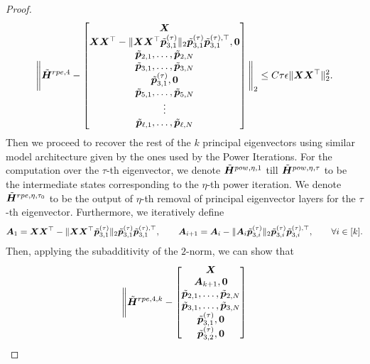 \begin{proof}
    \begin{align*}
        \Bigg\Vert\tilde{\boldsymbol{H}}^{rpe,4}-\begin{bmatrix}
            \boldsymbol{X}\\
            \boldsymbol{X}\boldsymbol{X}^\top-\Vert\boldsymbol{X}\boldsymbol{X}^\top\tilde{\boldsymbol{p}}_{3,1}^{(\tau)}\Vert_2\tilde{\boldsymbol{p}}_{3,1}^{(\tau)}\tilde{\boldsymbol{p}}_{3,1}^{(\tau),\top},\boldsymbol{0}\\
            \tilde{\boldsymbol{p}}_{2,1},\ldots,\tilde{\boldsymbol{p}}_{2,N}\\
            \tilde{\boldsymbol{p}}_{3,1},\ldots,\tilde{\boldsymbol{p}}_{3,N}\\
            \tilde{\boldsymbol{p}}_{3,1}^{(\tau)},\boldsymbol{0}\\
            \tilde{\boldsymbol{p}}_{5,1},\ldots,\tilde{\boldsymbol{p}}_{5,N}\\
            \vdots\\
            \tilde{\boldsymbol{p}}_{\ell,1},\ldots,\tilde{\boldsymbol{p}}_{\ell,N}
        \end{bmatrix}\Bigg\Vert_2\leq C\tau\epsilon\Vert\boldsymbol{X}\boldsymbol{X}^\top\Vert_2^2.
    \end{align*}
    Then we proceed to recover the rest of the $k$ principal eigenvectors using similar model architecture given by the ones used by the Power Iterations. For the computation over the $\tau$-th eigenvector, we denote $\tilde{\boldsymbol{H}}^{pow, \eta, 1}$ till $\tilde{\boldsymbol{H}}^{pow, \eta, \tau}$ to be the intermediate states corresponding to the $\eta$-th power iteration. We denote $\tilde{\boldsymbol{H}}^{rpe,\eta,\tau_0}$ to be the output of $\eta$-th removal of principal eigenvector layers for the $\tau$-th eigenvector. Furthermore, we iteratively define
    \begin{align*}
        \boldsymbol{A}_1 =\boldsymbol{X}\boldsymbol{X}^\top-\Vert\boldsymbol{X}\boldsymbol{X}^\top\tilde{\boldsymbol{p}}_{3,1}^{(\tau)}\Vert_2\tilde{\boldsymbol{p}}_{3,1}^{(\tau)}\tilde{\boldsymbol{p}}_{3,1}^{(\tau),\top},\qquad \boldsymbol{A}_{i+1}=\boldsymbol{A}_{i}-\Vert\boldsymbol{A}_i\tilde{\boldsymbol{p}}_{3,i}^{(\tau)}\Vert_2\tilde{\boldsymbol{p}}_{3,i}^{(\tau)}\tilde{\boldsymbol{p}}_{3,i}^{(\tau),\top},\qquad\forall i\in[k].
    \end{align*}
    Then, applying the subadditivity of the $2$-norm, we can show that
    \begin{align*}
        \Bigg\Vert\tilde{\boldsymbol{H}}^{rpe,4,k}-\begin{bmatrix}
            \boldsymbol{X}\\
            \boldsymbol{A}_{k+1},\boldsymbol{0}\\
            \tilde{\boldsymbol{p}}_{2,1},\ldots,\tilde{\boldsymbol{p}}_{2,N}\\
            \tilde{\boldsymbol{p}}_{3,1},\ldots,\tilde{\boldsymbol{p}}_{3,N}\\
            \tilde{\boldsymbol{p}}_{3,1}^{(\tau)},\boldsymbol{0}\\
            \tilde{\boldsymbol{p}}_{3,2}^{(\tau)},\boldsymbol{0}\\

\end{bmatrix}
\end{align*}
\end{proof}
